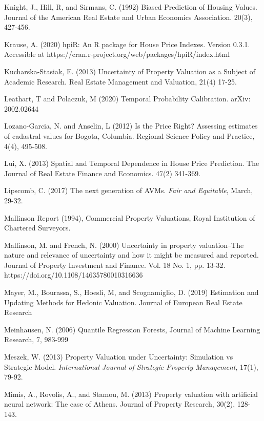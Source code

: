 \documentclass[colTwo]{anon}
\theoremstyle{definition}
\begin{document}
\begin{thebibliography}{50}
\harvarditem{}{}{}Knight, J., Hill, R, and Sirmans, C. (1992) Biased Prediction of Housing Values. Journal of the American Real Estate and Urban Economics Association. 20(3), 427-456.

\harvarditem{}{}{}Krause, A. (2020) hpiR: An R package for House Price Indexes.  Version 0.3.1.  Accessible at https://cran.r-project.org/web/packages/hpiR/index.html

\harvarditem{}{}{}Kucharska-Stasiak, E. (2013) Uncertainty of Property Valuation as a Subject of Academic Research. Real Estate Management and Valuation, 21(4) 17-25.

\harvarditem{}{}{}Leathart, T and Polaczuk, M  (2020) Temporal Probability Calibration. arXiv: 2002.02644

\harvarditem{}{}{}Lozano-Garcia, N. and Anselin, L (2012) Is the Price Right?  Assessing estimates of cadastral values for Bogota, Columbia. Regional Science Policy and Practice, 4(4), 495-508.

\harvarditem{}{}{}Lui, X. (2013) Spatial and Temporal Dependence in House Price Prediction. The Journal of Real Estate Finance and Economics. 47(2) 341-369.

\harvarditem{}{}{}Lipscomb, C. (2017) The next generation of AVMs. \textit{Fair and Equitable}, March, 29-32.

\harvarditem{}{}{}Mallinson Report (1994), Commercial Property Valuations, Royal Institution of Chartered Surveyors.

\harvarditem{}{}{}Mallinson, M. and French, N. (2000) Uncertainty in property valuation--The nature and relevance of uncertainty and how it might be measured and reported. Journal of Property Investment and Finance. Vol. 18 No. 1, pp. 13-32. https://doi.org/10.1108/14635780010316636

\harvarditem{}{}{}Mayer, M., Bourassa, S., Hoesli, M, and Scognamiglio, D. (2019) Estimation and Updating Methods for Hedonic Valuation. Journal of European Real Estate Research

\harvarditem{}{}{}Meinhausen, N.  (2006) Quantile Regression Forests, Journal of Machine Learning Research, 7, 983-999

\harvarditem{}{}{}Meszek, W. (2013) Property Valuation under Uncertainty: Simulation vs Strategic Model. \textit{International Journal of Strategic Property Management}, 17(1), 79-92.

\harvarditem{}{}{}Mimis, A., Rovolis, A., and Stamou, M. (2013) Property valuation with artificial neural network: The case of Athens. Journal of Property Research, 30(2), 128-143.


\end{thebibliography}
\end{document}
